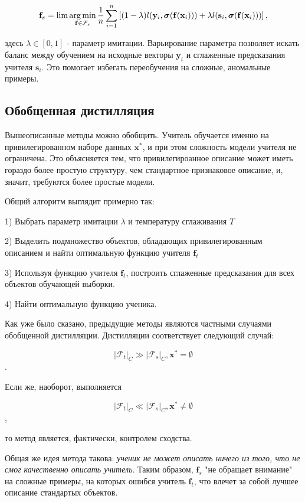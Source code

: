 \documentclass[12pt,twoside]{article}
\begin{document}
$$ \mathbf{f}_s = \lim\argmin_{\mathbf{f} \in \mathcal{F}_s} \frac{1}{n} \sum\limits_{i=1}^n
\left[ (1 - \lambda) l(\mathbf{y}_i, \boldsymbol{\sigma} (\mathbf{f}(\mathbf{x}_i))) 
+ \lambda l (\mathbf{s}_i, \boldsymbol{\sigma} (\mathbf{f}(\mathbf{x}_i))) \right],$$

здесь $\lambda \in [0, 1]$ - параметр имитации. Варьирование параметра позволяет искать баланс между обучением на исходные векторы $\mathbf{y}_i$ и сглаженные предсказания учителя $\mathbf{s}_i$. Это помогает избегать переобучения на сложные, аномальные примеры.

\subsection{Обобщенная дистилляция}

Вышеописанные методы можно обобщить. Учитель обучается именно на  привилегированном наборе данных $\mathbf{x}^*$, 
и при этом сложность модели учителя не ограничена. Это объясняется тем, что привилегироанное описание может иметь гораздо более простую структуру, чем стандартное признаковое описание, и, значит, требуются более простые модели. 

Общий алгоритм выглядит примерно так:

1) Выбрать параметр имитации $\lambda$ и температуру сглаживания $T$

2) Выделить подмножество объектов, обладающих привилегированным описанием и найти оптимальную функцию учителя $\mathbf{f}_t$

3) Используя функцию учителя $\mathbf{f}_t$, построить сглаженные предсказания для всех объектов обучающей выборки.

4) Найти оптимальную функцию ученика.

Как уже было сказано, предыдущие методы являются частными случаями обобщенной дистилляции. Дистилляции соответствует следующий случай:

$$ |\mathcal{F}_t|_C \gg |\mathcal{F}_s|_C, \mathbf{x}^* = \emptyset $$.

Если же, наоборот, выполняется

$$|\mathcal{F}_t|_C \ll |\mathcal{F}_s|_C, \mathbf{x}^* \neq \emptyset $$,

то метод является, фактически, контролем сходства.

Общая же идея метода такова: \emph{ученик не может описать ничего из того, что не смог качественно описать учитель}.
Таким образом, $\mathbf{f}_s$ "не обращает внимание" на сложные примеры, на которых ошибся учитель $\mathbf{f}_t$,  что влечет за собой лучшее описание стандартых объектов.
\end{document}

